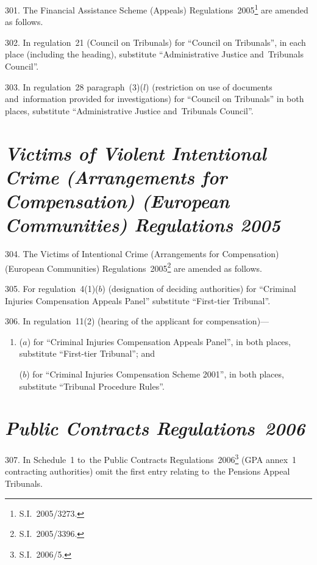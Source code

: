 \documentclass[12pt,a4paper]{article}
\begin{document}
301.  The Financial Assistance Scheme (Appeals) Regulations~2005\footnote{S.I.~2005/3273.} are amended as follows.

\medskip

302.  In regulation~21 (Council on Tribunals) for “Council on Tribunals”, in each place (including the heading), substitute “Administrative Justice and~Tribunals Council”.

\medskip

303.  In regulation~28 paragraph~(3)($l$)  (restriction on use of documents and~information provided for investigations) for “Council on Tribunals” in both places, substitute “Administrative Justice and~Tribunals Council”.

\section*{\itshape\sloppy{} Victims of Violent Intentional Crime (Arrangements for Compensation) (European Communities) Regulations 2005}

304.  The Victims of Intentional Crime (Arrangements for Compensation) (European Communities) Regulations~2005\footnote{S.I.~2005/3396.} are amended as follows.

\medskip

305.  For regulation~4(1)($b$)  (designation of deciding authorities) for “Criminal Injuries Compensation Appeals Panel” substitute “First-tier Tribunal”.

\medskip

306.  In regulation~11(2) (hearing of the applicant for compensation)—
\begin{enumerate}\item[]
($a$) for “Criminal Injuries Compensation Appeals Panel”, in both places, substitute “First-tier Tribunal”; and

($b$) for “Criminal Injuries Compensation Scheme 2001”, in both places, substitute “Tribunal Procedure Rules”.
\end{enumerate}

\section*{\itshape Public Contracts Regulations~2006}

307.  In Schedule~1 to~the Public Contracts Regulations~2006\footnote{S.I.~2006/5.} (GPA annex~1 contracting authorities) omit the first entry relating to~the Pensions Appeal Tribunals.
\end{document}
